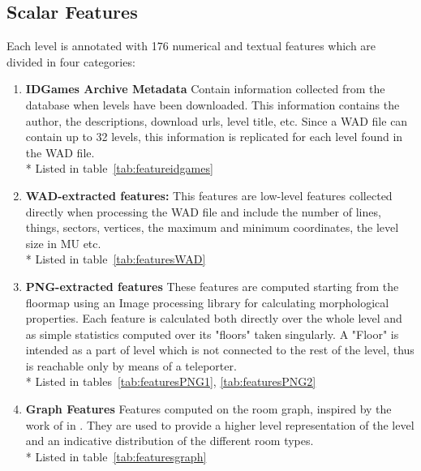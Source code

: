 	

\subsection{Scalar Features}
\label{features}
Each level is annotated with 176 numerical and textual features which are divided in four categories:
\begin{enumerate}
	\item \textbf{IDGames Archive Metadata} Contain information collected from the database when levels have been downloaded. This information contains the author, the descriptions, download urls, level title, etc. Since a WAD file can contain up to 32 levels, this information is replicated for each level found in the WAD file. \\*
	 Listed in table~\ref{tab:featureidgames}
	\item \textbf{WAD-extracted features:} This features are low-level features collected directly when processing the WAD file and include the number of lines, things, sectors, vertices, the maximum and minimum coordinates, the level size in \gls{MU} etc. \\* Listed in table~\ref{tab:featuresWAD}
	\item \textbf{PNG-extracted features} These features are computed starting from the \gls{floormap} using an Image processing library for calculating morphological properties. Each feature is calculated both directly over the whole level and as simple statistics computed over its "floors" taken singularly. A "Floor" is intended as a part of level which is not connected to the rest of the level, thus is reachable only by means of a teleporter. \\*
	Listed in tables~\ref{tab:featuresPNG1}, \ref{tab:featuresPNG2}
	\item \textbf{Graph Features} Features computed on the room graph, inspired by the work of \citeauthor{Amigoni} in \cite{Amigoni}. They are used to provide a higher level representation of the level and an indicative distribution of the different room types. \\*
	Listed in table~\ref{tab:featuresgraph}
\end{enumerate}

